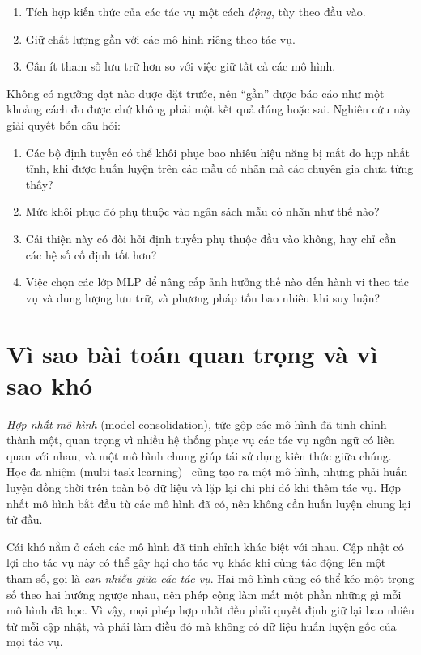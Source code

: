 \begin{enumerate}
  \item[\textbf{O1.}] Tích hợp kiến thức của các tác vụ một cách \emph{động}, tùy theo đầu vào.
  \item[\textbf{O2.}] Giữ chất lượng gần với các mô hình riêng theo tác vụ.
  \item[\textbf{O3.}] Cần ít tham số lưu trữ hơn so với việc giữ tất cả các mô hình.
\end{enumerate}

Không có ngưỡng đạt nào được đặt trước, nên ``gần'' được báo cáo như một khoảng cách đo được chứ không phải một kết quả đúng hoặc sai. Nghiên cứu này giải quyết bốn câu hỏi:

\begin{enumerate}
  \item[\textbf{RQ1.}] Các bộ định tuyến có thể khôi phục bao nhiêu hiệu năng bị mất do hợp nhất tĩnh, khi được huấn luyện trên các mẫu có nhãn mà các chuyên gia chưa từng thấy?
  \item[\textbf{RQ2.}] Mức khôi phục đó phụ thuộc vào ngân sách mẫu có nhãn như thế nào?
  \item[\textbf{RQ3.}] Cải thiện này có đòi hỏi định tuyến phụ thuộc đầu vào không, hay chỉ cần các hệ số cố định tốt hơn?
  \item[\textbf{RQ4.}] Việc chọn các lớp MLP để nâng cấp ảnh hưởng thế nào đến hành vi theo tác vụ và dung lượng lưu trữ, và phương pháp tốn bao nhiêu khi suy luận?
\end{enumerate}

\section{Vì sao bài toán quan trọng và vì sao khó}

\emph{Hợp nhất mô hình} (model consolidation), tức gộp các mô hình đã tinh chỉnh thành một, quan trọng vì nhiều hệ thống phục vụ các tác vụ ngôn ngữ có liên quan với nhau, và một mô hình chung giúp tái sử dụng kiến thức giữa chúng. Học đa nhiệm (multi-task learning)~\cite{caruana1997multitask} cũng tạo ra một mô hình, nhưng phải huấn luyện đồng thời trên toàn bộ dữ liệu và lặp lại chi phí đó khi thêm tác vụ. Hợp nhất mô hình bắt đầu từ các mô hình đã có, nên không cần huấn luyện chung lại từ đầu.

Cái khó nằm ở cách các mô hình đã tinh chỉnh khác biệt với nhau. Cập nhật có lợi cho tác vụ này có thể gây hại cho tác vụ khác khi cùng tác động lên một tham số, gọi là \emph{can nhiễu giữa các tác vụ}. Hai mô hình cũng có thể kéo một trọng số theo hai hướng ngược nhau, nên phép cộng làm mất một phần những gì mỗi mô hình đã học. Vì vậy, mọi phép hợp nhất đều phải quyết định giữ lại bao nhiêu từ mỗi cập nhật, và phải làm điều đó mà không có dữ liệu huấn luyện gốc của mọi tác vụ.

